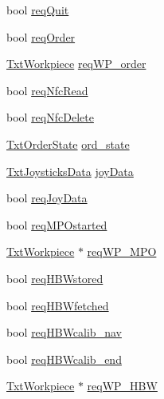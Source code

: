 \begin{DoxyCompactItemize}
\item 
bool \hyperlink{classft_1_1_txt_vacuum_gripper_robot_a1d0957107dc1a4ec13b268668d750a03}{req\+Quit}
\item 
bool \hyperlink{classft_1_1_txt_vacuum_gripper_robot_a99d822613ac69cf4c46d209241790c5d}{req\+Order}
\item 
\hyperlink{classft_1_1_txt_workpiece}{Txt\+Workpiece} \hyperlink{classft_1_1_txt_vacuum_gripper_robot_a3508707afd4a863dd441656d19c98ff3}{req\+W\+P\+\_\+order}
\item 
bool \hyperlink{classft_1_1_txt_vacuum_gripper_robot_ac60d86a7baeba2e8382289ec30df282c}{req\+Nfc\+Read}
\item 
bool \hyperlink{classft_1_1_txt_vacuum_gripper_robot_a28742374c8647f51bc58e51bc8902d7b}{req\+Nfc\+Delete}
\item 
\hyperlink{structft_1_1_txt_order_state}{Txt\+Order\+State} \hyperlink{classft_1_1_txt_vacuum_gripper_robot_ae08a9b2ddbac6dc0310df391ecde6ba2}{ord\+\_\+state}
\item 
\hyperlink{classft_1_1_txt_joysticks_data}{Txt\+Joysticks\+Data} \hyperlink{classft_1_1_txt_vacuum_gripper_robot_ae5c42b3e36085efdada4b80af166d961}{joy\+Data}
\item 
bool \hyperlink{classft_1_1_txt_vacuum_gripper_robot_a2adead238804ada52cca87289556897b}{req\+Joy\+Data}
\item 
bool \hyperlink{classft_1_1_txt_vacuum_gripper_robot_a7d29a10f0418356f732e429eb12ff9f4}{req\+M\+P\+Ostarted}
\item 
\hyperlink{classft_1_1_txt_workpiece}{Txt\+Workpiece} $\ast$ \hyperlink{classft_1_1_txt_vacuum_gripper_robot_add6f0424c5e959d70941152687dc9dbd}{req\+W\+P\+\_\+\+M\+PO}
\item 
bool \hyperlink{classft_1_1_txt_vacuum_gripper_robot_a5ad685c9df951eeb23c1a4aaed8a5da9}{req\+H\+B\+Wstored}
\item 
bool \hyperlink{classft_1_1_txt_vacuum_gripper_robot_ac10363d74173bc2ff8338187079ad1b6}{req\+H\+B\+Wfetched}
\item 
bool \hyperlink{classft_1_1_txt_vacuum_gripper_robot_a29cb3124d7e95fda8dddef0ab485af71}{req\+H\+B\+Wcalib\+\_\+nav}
\item 
bool \hyperlink{classft_1_1_txt_vacuum_gripper_robot_a1a69482a35c4a0911fe675b7a30641d6}{req\+H\+B\+Wcalib\+\_\+end}
\item 
\hyperlink{classft_1_1_txt_workpiece}{Txt\+Workpiece} $\ast$ \hyperlink{classft_1_1_txt_vacuum_gripper_robot_ac968fa69403dd05dc7cf3e0ec3bf07b4}{req\+W\+P\+\_\+\+H\+BW}
\item 

\end{DoxyCompactItemize}

